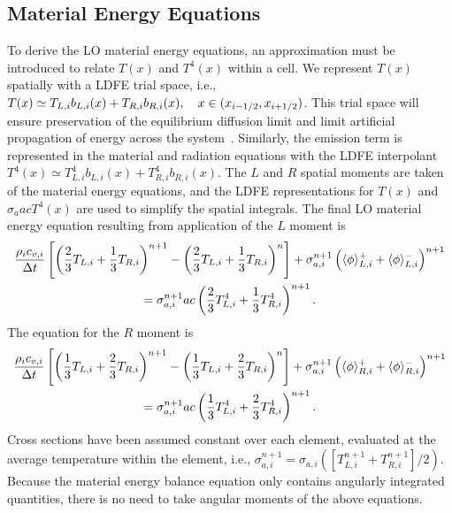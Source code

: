 \subsection{Material Energy Equations}

To derive the LO material energy equations, an approximation must be introduced to relate
$T(x)$ and $T^4(x)$ within a cell.  We represent $T(x)$ spatially 
with a LDFE trial space, i.e., $ T(x) \simeq T_{L,i} b_{L,i}(x) + T_{R,i} b_{R,i}(x),\quad x\in(x_{i-1/2},x_{{i+1/2}})$.
This trial space will ensure preservation of the equilibrium
diffusion limit and limit artificial propagation of energy across the system~\cite{teleportation}. 
Similarly, the emission term is represented in the material and radiation equations with the LDFE
interpolant $T^4(x)\simeq T_{L,i}^4 b_{L,i}(x) + T_{R,i}^4 b_{R,i}(x)$.   The $L$ and $R$ spatial moments are taken of the material
energy equations, and the LDFE representations for $T(x)$ and $\sigma_a a c T^4(x)$ are used to
simplify the spatial integrals. The final LO material energy
 equation resulting from application of the $L$ moment is
 \begin{multline}\label{eq:lo_mat_dis1}
     \frac{\rho_i c_{v,i}}{\Delta t}\left[ \left(\frac{2}{3}T_{L,i} + \frac{1}{3}T_{R,i}
        \right)^{n+1} - \left(\frac{2}{3}T_{L,i} + \frac{1}{3}T_{R,i}
    \right)^{n} \right]  + \sigma_{a,i}^{n+1} \left( \langle \phi \rangle_{L,i}^+ +
    \langle \phi \rangle_{L,i}^- \right)^{n+1} \\ = \sigma_{a,i}^{n+1}a c
\left( \frac{2}{3} T_{L,i}^4 + \frac{1}{3}T_{R,i}^4
        \right)^{n+1}.
\end{multline}
The equation for the $R$ moment is
 \begin{multline}\label{eq:lo_mat_dis2}
     \frac{\rho_i c_{v,i}}{\Delta t}\left[ \left(\frac{1}{3}T_{L,i} + \frac{2}{3}T_{R,i}
        \right)^{n+1} - \left(\frac{1}{3}T_{L,i} + \frac{2}{3}T_{R,i}
    \right)^{n} \right]  + \sigma_{a,i}^{n+1} \left( \langle \phi \rangle_{R,i}^+ +
    \langle \phi \rangle_{R,i}^- \right)^{n+1} \\ = \sigma_{a,i}^{n+1}a c
\left( \frac{1}{3} T_{L,i}^4 + \frac{2}{3}T_{R,i}^4
        \right)^{n+1}.
\end{multline}
Cross sections have been assumed constant over each element, evaluated at the
average temperature within the element, i.e., $\sigma_{a,i}^{n+1} =
\sigma_{a,i}([T^{n+1}_{L,i}+T^{n+1}_{R,i}]/2)$.
Because the material energy balance equation
 only contains angularly integrated quantities, there is no need to take angular
 moments of the above equations.  


